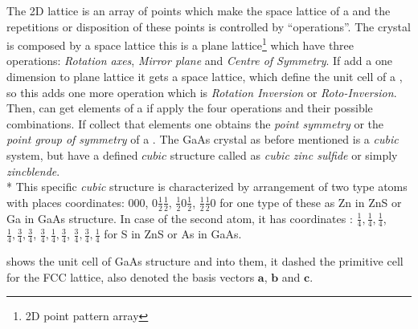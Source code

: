 The 2D lattice is an array of points which make the space lattice of a \cry and the repetitions or disposition of these points is controlled by ``\sym operations''\cite{chatterjee2008crystallography}. The crystal is composed by a space lattice this is a plane lattice\footnote{2D point pattern array} which have three \sym operations: \emph{Rotation axes}, \emph{Mirror plane} and \emph{Centre of Symmetry}. If add a one dimension to plane lattice it gets a space lattice, which define the unit cell of a \cry, so this adds one more \sym operation which is \emph{Rotation Inversion} or \emph{Roto-Inversion}. Then, can get \sym elements of a \cry if  apply the four \sym operations and their possible combinations. If collect that \sym elements one obtains the \emph{point symmetry} or the \emph{point group of symmetry} of a \cry. 
The GaAs crystal as before mentioned is a \emph{cubic} system, but have a defined $cubic$ structure  called  as \emph{cubic zinc sulfide} or simply \emph{zincblende}. \\*
This specific \emph{cubic} structure  is characterized by arrangement of two type atoms with places  coordinates: $000$, $0\frac{1}{2}\frac{1}{2}$,  $\frac{1}{2} 0\frac{1}{2}$, $\frac{1}{2} \frac{1}{2} 0$ for one type of these as Zn in ZnS or Ga in GaAs structure. In case of the second atom, it has coordinates : $\frac{1}{4},\frac{1}{4},\frac{1}{4}$, $\frac{1}{4},\frac{3}{4},\frac{3}{4}$, $\frac{3}{4},\frac{1}{4}, \frac{3}{4}$, $\frac{3}{4},\frac{3}{4},\frac{1}{4}$ for S in ZnS or As in GaAs\cite{kittel2018kittel,mckelvey1966solid}. 

 shows the unit cell of GaAs structure and into them, it  dashed the primitive cell for the FCC lattice, also denoted the basis vectors  $\mathbf{a}$, $\mathbf{b}$ and $\mathbf{c}$.

